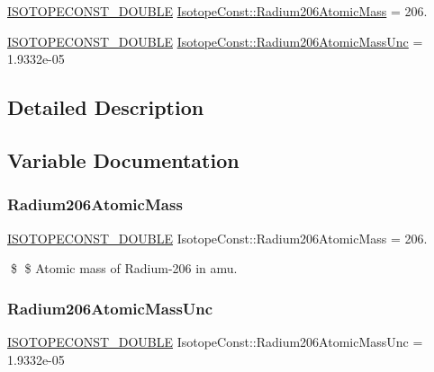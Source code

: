\begin{DoxyCompactItemize}
\item 
\mbox{\hyperlink{group___isotope_const-_macros_ga8f45a7272ce02c0b4c65c44636ed719a}{I\+S\+O\+T\+O\+P\+E\+C\+O\+N\+S\+T\+\_\+\+D\+O\+U\+B\+LE}} \mbox{\hyperlink{group___isotope_const-_radium-_ra206_gabc8083adb41f4b3e22880e9a0284e96d}{Isotope\+Const\+::\+Radium206\+Atomic\+Mass}} = 206.
\item 
\mbox{\hyperlink{group___isotope_const-_macros_ga8f45a7272ce02c0b4c65c44636ed719a}{I\+S\+O\+T\+O\+P\+E\+C\+O\+N\+S\+T\+\_\+\+D\+O\+U\+B\+LE}} \mbox{\hyperlink{group___isotope_const-_radium-_ra206_ga49fa6a57d2a6c7748e92c64fb9c7b322}{Isotope\+Const\+::\+Radium206\+Atomic\+Mass\+Unc}} = 1.\+9332e-\/05
\end{DoxyCompactItemize}


\subsection{Detailed Description}


\subsection{Variable Documentation}
\mbox{\label{group___isotope_const-_radium-_ra206_gabc8083adb41f4b3e22880e9a0284e96d}} 
\subsubsection{\texorpdfstring{Radium206\+Atomic\+Mass}{Radium206AtomicMass}}
{\footnotesize\ttfamily \mbox{\hyperlink{group___isotope_const-_macros_ga8f45a7272ce02c0b4c65c44636ed719a}{I\+S\+O\+T\+O\+P\+E\+C\+O\+N\+S\+T\+\_\+\+D\+O\+U\+B\+LE}} Isotope\+Const\+::\+Radium206\+Atomic\+Mass = 206.}

\$ \$ Atomic mass of Radium-\/206 in amu. \mbox{\label{group___isotope_const-_radium-_ra206_ga49fa6a57d2a6c7748e92c64fb9c7b322}} 
\subsubsection{\texorpdfstring{Radium206\+Atomic\+Mass\+Unc}{Radium206AtomicMassUnc}}
{\footnotesize\ttfamily \mbox{\hyperlink{group___isotope_const-_macros_ga8f45a7272ce02c0b4c65c44636ed719a}{I\+S\+O\+T\+O\+P\+E\+C\+O\+N\+S\+T\+\_\+\+D\+O\+U\+B\+LE}} Isotope\+Const\+::\+Radium206\+Atomic\+Mass\+Unc = 1.\+9332e-\/05}

